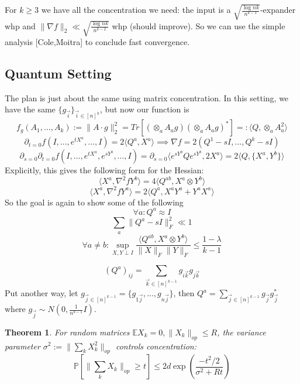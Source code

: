\documentclass{article}
\newtheorem{theorem}{Theorem}
\newcommand{\E}{\mathbb{E}}
\renewcommand{\Pr}{\mathbb{P}}
\begin{document}
For $k \geq 3$ we have all the concentration we need: the input is a $\sqrt{\frac{\log nk}{n^{k-1}}}$-expander whp and $\|\nabla f\|_{2} \ll \sqrt{\frac{\log nk}{n^{k-2}}}$ whp (should improve). So we can use the simple analysis [Cole,Moitra] to conclude fast convergence. 


\subsection{Quantum Setting}
The plan is just about the same using matrix concentration. In this setting, we have the same $\{g_{\vec{i}}\}_{\vec{i} \in [n]^{k}}$, but now our function is
\[ f_{g}(A_{1}, ..., A_{k}) := \|A \cdot g\|_{2}^{2} = Tr[ ( \otimes_{a} A_{a} g) ( \otimes_{a} A_{a} g)^{*} ] =: \langle Q, \otimes_{a} A_{a}^{2} \rangle   \]
\[ \partial_{t=0} f(I, ...,e^{tX^{a}}, ..., I) = 2 \langle Q^{a}, X^{a} \rangle \implies \nabla f = 2 (Q^{1} - sI, ..., Q^{k} - sI)    \]
\[ \partial_{s=0} \partial_{t=0} f(I, ..., e^{tX^{a}}, e^{sY^{b}}, ..., I) = \partial_{s=0} \langle e^{sY^{b}} Q e^{sY^{b}}, 2 X^{a} \rangle = 2 \langle Q, \{X^{a}, Y^{b}\} \rangle   \]
Explicitly, this gives the following form for the Hessian:
\[ \langle X^{a}, \nabla^{2} f Y^{b} \rangle = 4 \langle Q^{ab}, X^{a} \otimes Y^{b} \rangle   \]
\[ \langle X^{a}, \nabla^{2} f Y^{a} \rangle = 2 \langle Q^{a}, X^{a} Y^{a} + Y^{a} X^{a} \rangle  \]
So the goal is again to show some of the following
\[ \forall a: Q^{a} \approx I  \]
\[ \sum_{a} \|Q^{a} - sI\|_{F}^{2} \ll 1   \]
\[ \forall a \neq b: \sup_{X,Y \perp I} \frac{\langle Q^{ab}, X^{a} \otimes Y^{b} \rangle}{\|X\|_{F} \|Y\|_{F}} \leq \frac{1 - \lambda}{k-1}   \]

\[ (Q^{a})_{ij} = \sum_{\vec{k} \in [n]^{k-1}} g_{i\vec{k}} g_{j \vec{k}}  \]
Put another way, let $g_{\vec{j} \in [n]^{k-1}} = \{g_{1 \vec{j}}, ..., g_{n \vec{j}}\}$, then $Q^{a} = \sum_{\vec{j} \in [n]^{k-1}} g_{\vec{j}} g_{\vec{j}}^{*}$ where $g_{\vec{j}} \sim N(0,\frac{1}{n^{k-1}} I)$. 

\begin{theorem}
For random matrices $\E X_{k} = 0, \|X_{k}\|_{op} \leq R$, the variance parameter $\sigma^{2} := \|\sum_{k} X_{k}^{2} \|_{op}$ controls concentration:
\[ \Pr [ \|\sum_{k} X_{k}\|_{op} \geq t ] \leq 2 d \exp \left( \frac{-t^{2}/2}{\sigma^{2} + Rt} \right)   \]
\end{theorem}
\end{document}
